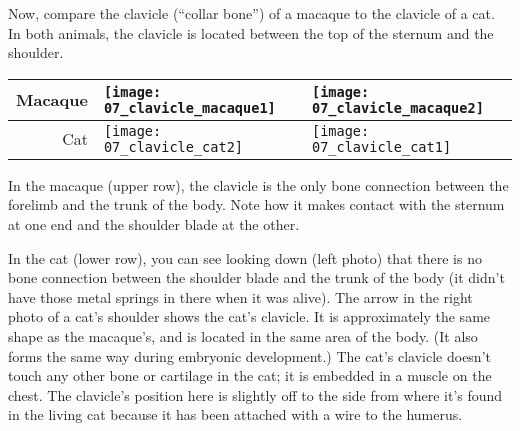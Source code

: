 \documentclass[12pt, hidelinks]{exam}
\newcommand*\AnswerBox[2]{%
    \parbox[t][#1]{0.92\textwidth}{%
    \begin{solution}#2\end{solution}}
    \vspace{\stretch{1}}
}
\begin{document}
\begin{questions}

\question
Now, compare the clavicle (``collar bone'') of a macaque to the clavicle of a cat. In both animals, the clavicle is located between the top of the sternum and the shoulder.

\begin{longtable}[c]{@{}rll@{}}
  \toprule
  Macaque &
  \texttt{[image: 07\_clavicle\_macaque1]}	&
  \texttt{[image: 07\_clavicle\_macaque2]}	\tabularnewline
  \midrule
  Cat &
  \texttt{[image: 07\_clavicle\_cat2]}	&
  \texttt{[image: 07\_clavicle\_cat1]}	\tabularnewline
  \bottomrule
\end{longtable}

In the macaque (upper row), the clavicle is the only bone connection between
the forelimb and the trunk of the body. Note how it makes contact with
the sternum at one end and the shoulder blade at the other. 


In the cat (lower row), you can see looking down (left photo) that
there is no bone connection between the shoulder blade and the trunk of
the body (it didn't have those metal springs in there when it was
alive). The arrow in the right photo of a cat's shoulder shows
the cat's clavicle. It is approximately the same shape as the
macaque's, and is located in the same area of the body. (It also forms
the same way during embryonic development.) The cat's clavicle doesn't touch
any other bone or cartilage in the cat; it is embedded in a muscle on the
chest. The clavicle's position here is slightly off to the side from where it's
found in the living cat because it has been attached with a wire to the
humerus.

\end{questions}
\end{document}

